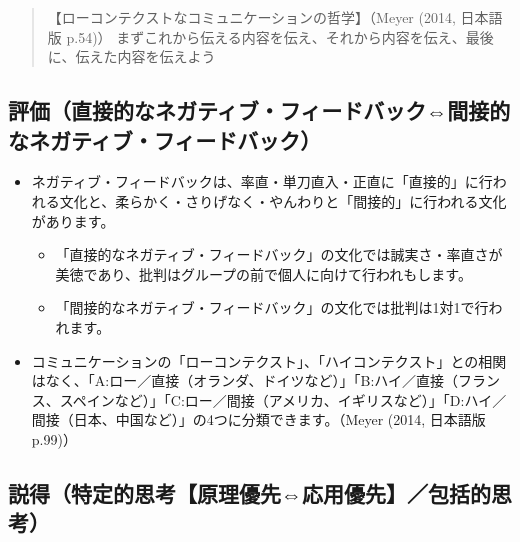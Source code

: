 \documentclass[
]{book}
\begin{document}
\begin{quote}
【ローコンテクストなコミュニケーションの哲学】（Meyer (2014, 日本語版 p.54)）
まずこれから伝える内容を伝え、それから内容を伝え、最後に、伝えた内容を伝えよう
\end{quote}

\hypertarget{ux8a55ux4fa1ux76f4ux63a5ux7684ux306aux30cdux30acux30c6ux30a3ux30d6ux30d5ux30a3ux30fcux30c9ux30d0ux30c3ux30afux9593ux63a5ux7684ux306aux30cdux30acux30c6ux30a3ux30d6ux30d5ux30a3ux30fcux30c9ux30d0ux30c3ux30af}{%
\subsection{評価（直接的なネガティブ・フィードバック⇔間接的なネガティブ・フィードバック）}\label{ux8a55ux4fa1ux76f4ux63a5ux7684ux306aux30cdux30acux30c6ux30a3ux30d6ux30d5ux30a3ux30fcux30c9ux30d0ux30c3ux30afux9593ux63a5ux7684ux306aux30cdux30acux30c6ux30a3ux30d6ux30d5ux30a3ux30fcux30c9ux30d0ux30c3ux30af}}

\begin{itemize}
\item
  ネガティブ・フィードバックは、率直・単刀直入・正直に「直接的」に行われる文化と、柔らかく・さりげなく・やんわりと「間接的」に行われる文化があります。

  \begin{itemize}
  \item
    「直接的なネガティブ・フィードバック」の文化では誠実さ・率直さが美徳であり、批判はグループの前で個人に向けて行われもします。
  \item
    「間接的なネガティブ・フィードバック」の文化では批判は1対1で行われます。
  \end{itemize}
\item
  コミュニケーションの「ローコンテクスト」、「ハイコンテクスト」との相関はなく、「A:ロー／直接（オランダ、ドイツなど）」「B:ハイ／直接（フランス、スペインなど）」「C:ロー／間接（アメリカ、イギリスなど）」「D:ハイ／間接（日本、中国など）」の4つに分類できます。（Meyer (2014, 日本語版 p.99)）
\end{itemize}

\hypertarget{ux8aacux5f97ux7279ux5b9aux7684ux601dux8003ux539fux7406ux512aux5148ux5fdcux7528ux512aux5148ux5305ux62ecux7684ux601dux8003}{%
\subsection{説得（特定的思考【原理優先⇔応用優先】／包括的思考）}\label{ux8aacux5f97ux7279ux5b9aux7684ux601dux8003ux539fux7406ux512aux5148ux5fdcux7528ux512aux5148ux5305ux62ecux7684ux601dux8003}}
\end{document}
